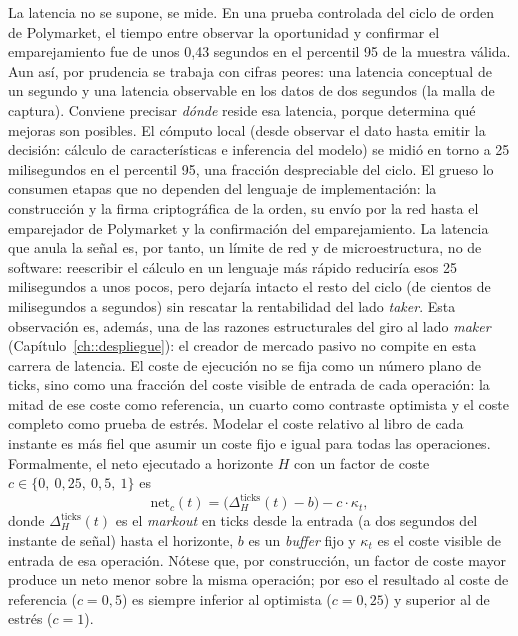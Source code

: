 La latencia no se supone, se mide. En una prueba controlada del ciclo de orden de
Polymarket, el tiempo entre observar la oportunidad y confirmar el emparejamiento fue de
unos 0,43 segundos en el percentil 95 de la muestra válida. Aun así, por prudencia se
trabaja con cifras peores: una latencia conceptual de un segundo y una latencia observable
en los datos de dos segundos (la malla de captura). Conviene precisar \emph{dónde} reside esa
latencia, porque determina qué mejoras son posibles. El cómputo local (desde observar el
dato hasta emitir la decisión: cálculo de características e inferencia del modelo) se midió en
torno a 25 milisegundos en el percentil 95, una fracción despreciable del ciclo. El grueso
lo consumen etapas que no dependen del lenguaje de implementación: la construcción y la firma
criptográfica de la orden, su envío por la red hasta el emparejador de Polymarket y la
confirmación del emparejamiento. La latencia que anula la señal es, por tanto, un límite de
red y de microestructura, no de software: reescribir el cálculo en un lenguaje más rápido
reduciría esos 25 milisegundos a unos pocos, pero dejaría intacto el resto del ciclo (de
cientos de milisegundos a segundos) sin rescatar la rentabilidad del lado \emph{taker}. Esta
observación es, además, una de las razones estructurales del giro al lado \emph{maker}
(Capítulo~\ref{ch::despliegue}): el creador de mercado pasivo no compite en esta carrera de
latencia. El coste de ejecución no se fija como un
número plano de ticks, sino como una fracción del coste visible de entrada de cada
operación: la mitad de ese coste como referencia, un cuarto como contraste optimista y el
coste completo como prueba de estrés. Modelar el coste relativo al libro de cada instante es
más fiel que asumir un coste fijo e igual para todas las operaciones. Formalmente, el neto
ejecutado a horizonte $H$ con un factor de coste $c \in \{0,\ 0{,}25,\ 0{,}5,\ 1\}$ es
\begin{equation}
\text{net}_c(t) = \big(\Delta^{\text{ticks}}_H (t) - b\big) - c \cdot \kappa_t,
\label{eq:coste}
\end{equation}
donde $\Delta^{\text{ticks}}_H (t)$ es el \emph{markout} en ticks desde la entrada (a dos
segundos del instante de señal) hasta el horizonte, $b$ es un \emph{buffer} fijo y $\kappa_t$
es el coste visible de entrada de esa operación. Nótese que, por construcción, un factor de
coste mayor produce un neto menor sobre la misma operación; por eso el resultado al coste de
referencia ($c=0{,}5$) es siempre inferior al optimista ($c=0{,}25$) y superior al de estrés
($c=1$).

